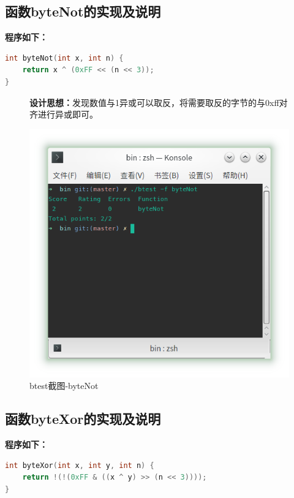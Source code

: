 \subsection{函数byteNot的实现及说明}

\textbf{程序如下：}
\begin{lstlisting}[language = c]
int byteNot(int x, int n) {
	return x ^ (0xFF << (n << 3));
}
\end{lstlisting}

\begin{figure}[H]
\begin{minipage}[c]{0.5\linewidth}
\textbf{设计思想：}发现数值与1异或可以取反，将需要取反的字节的与0xff对齐进行异或即可。	
\end{minipage}
\begin{minipage}[c]{0.4\linewidth}
\centering
\includegraphics[width=0.9\linewidth]{figures/byteNot}
\caption{btest截图-byteNot}
\label{fig:byteNote}
\end{minipage}
\end{figure}

\subsection{函数byteXor的实现及说明}

\textbf{程序如下：}
\begin{lstlisting}[language = c]
int byteXor(int x, int y, int n) {
	return !(!(0xFF & ((x ^ y) >> (n << 3))));
}
\end{lstlisting}

